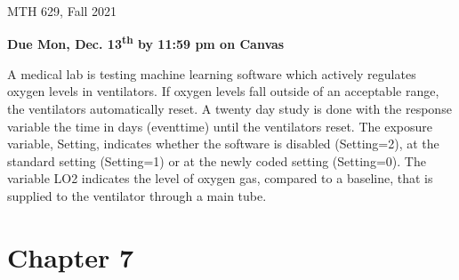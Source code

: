 \documentclass[12pt]{article}
\begin{document}
{
            \hfill {MTH 629, Fall 2021}}
\bigskip

{\bf Due Mon, Dec. 13\textsuperscript{th} by 11:59 pm on Canvas}

A medical lab is testing machine learning software which actively regulates oxygen levels in ventilators. If oxygen levels fall outside of an acceptable range, the ventilators automatically reset. A twenty day study is done with the response variable the time in days (eventtime) until the ventilators reset. The exposure variable, Setting, indicates whether the software is disabled (Setting=2), at the standard setting (Setting=1) or at the newly coded setting (Setting=0). The variable LO2 indicates the level of oxygen gas, compared to a baseline, that is supplied to the ventilator through a main tube.

\section{Chapter 7}
\end{document}
